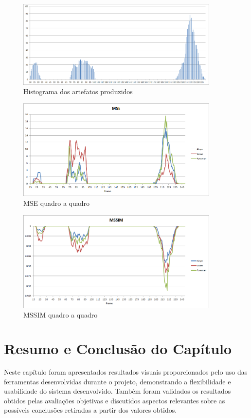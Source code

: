 \begin{figure}[!htb]
	\centering
	\includegraphics[width=0.9\textwidth]{./imgs/histogram.png}
	\caption{Histograma dos artefatos produzidos}
	\label{fig:histogram}
\end{figure}

\begin{figure}[!htb]
	\centering
	\includegraphics[width=0.9\textwidth]{./imgs/mse.png}
	\caption{MSE quadro a quadro}
	\label{fig:mse}
\end{figure}

\begin{figure}[!htb]
	\centering
	\includegraphics[width=0.9\textwidth]{./imgs/mssim.png}
	\caption{MSSIM quadro a quadro}
	\label{fig:mssim}
\end{figure}

\section{Resumo e Conclusão do Capítulo}

Neste capítulo foram apresentados resultados visuais proporcionados pelo uso das ferramentas desenvolvidas durante o projeto, demonstrando a flexibilidade e usabilidade do sistema desenvolvido.
Também foram validados os resultados obtidos pelas avaliações objetivas e discutidos aspectos relevantes sobre as possíveis conclusões retiradas a partir dos valores obtidos.
